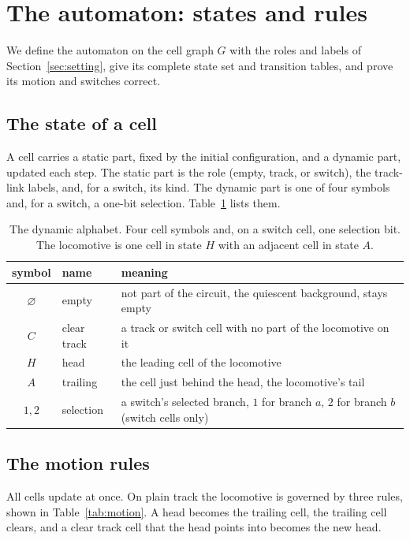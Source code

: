 \section{The automaton: states and rules}
\label{sec:automaton}

We define the automaton on the cell graph $G$ with the roles and labels of Section~\ref{sec:setting}, give its
complete state set and transition tables, and prove its motion and switches correct.

\subsection{The state of a cell}

A cell carries a static part, fixed by the initial configuration, and a dynamic part, updated each step. The
static part is the role (empty, track, or switch), the track-link labels, and, for a switch, its kind. The
dynamic part is one of four symbols and, for a switch, a one-bit selection. Table~\ref{tab:states} lists them.

\begin{table}[ht]
\centering
\begin{tabular}{@{}clp{8.2cm}@{}}
\toprule
symbol & name & meaning \\
\midrule
$\varnothing$ & empty & not part of the circuit, the quiescent background, stays empty \\
$C$ & clear track & a track or switch cell with no part of the locomotive on it \\
$H$ & head & the leading cell of the locomotive \\
$A$ & trailing & the cell just behind the head, the locomotive's tail \\
\midrule
$1,2$ & selection & a switch's selected branch, $1$ for branch $a$, $2$ for branch $b$ (switch cells only) \\
\bottomrule
\end{tabular}
\caption{The dynamic alphabet. Four cell symbols and, on a switch cell, one selection bit. The locomotive is
one cell in state $H$ with an adjacent cell in state $A$.}
\label{tab:states}
\end{table}

\subsection{The motion rules}

All cells update at once. On plain track the locomotive is governed by three rules, shown in
Table~\ref{tab:motion}. A head becomes the trailing cell, the trailing cell clears, and a clear track cell that
the head points into becomes the new head.

